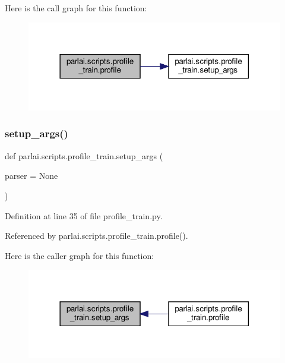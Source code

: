 Here is the call graph for this function\+:
\nopagebreak
\begin{figure}[H]
\begin{center}
\leavevmode
\includegraphics[width=318pt]{namespaceparlai_1_1scripts_1_1profile__train_a72ecdcc9932f8566d611093a2daeaa2a_cgraph}
\end{center}
\end{figure}
\mbox{\label{namespaceparlai_1_1scripts_1_1profile__train_abc73daf8a16d21ce56906342ec15cda9}} 
\subsubsection{\texorpdfstring{setup\+\_\+args()}{setup\_args()}}
{\footnotesize\ttfamily def parlai.\+scripts.\+profile\+\_\+train.\+setup\+\_\+args (\begin{DoxyParamCaption}\item[{}]{parser = {\ttfamily None} }\end{DoxyParamCaption})}



Definition at line 35 of file profile\+\_\+train.\+py.



Referenced by parlai.\+scripts.\+profile\+\_\+train.\+profile().

Here is the caller graph for this function\+:
\nopagebreak
\begin{figure}[H]
\begin{center}
\leavevmode
\includegraphics[width=318pt]{namespaceparlai_1_1scripts_1_1profile__train_abc73daf8a16d21ce56906342ec15cda9_icgraph}
\end{center}
\end{figure}
